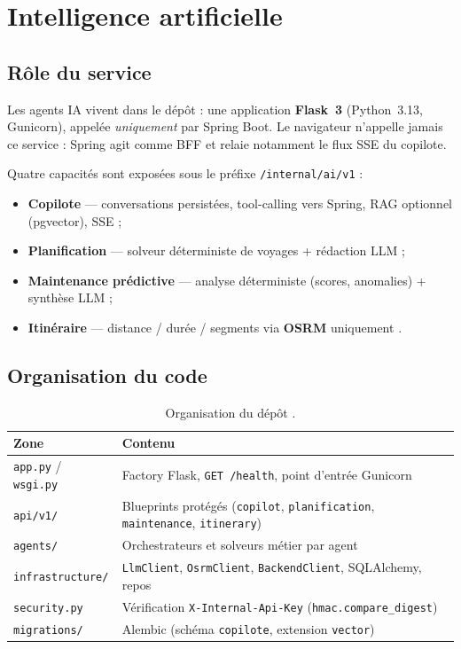 \chapter{Intelligence artificielle}
\label{chap:ia}

\section{Rôle du service}

Les agents IA vivent dans le dépôt  : une application \textbf{Flask~3}
(Python~3.13, Gunicorn), appelée \emph{uniquement} par Spring Boot. Le navigateur n'appelle jamais
ce service : Spring agit comme BFF et relaie notamment le flux SSE du copilote.

Quatre capacités sont exposées sous le préfixe \texttt{/internal/ai/v1} :

\begin{itemize}[leftmargin=*]
  \item \textbf{Copilote} --- conversations persistées, tool-calling vers Spring, RAG optionnel (pgvector), SSE ;
  \item \textbf{Planification} --- solveur déterministe de voyages + rédaction LLM ;
  \item \textbf{Maintenance prédictive} --- analyse déterministe (scores, anomalies) + synthèse LLM ;
  \item \textbf{Itinéraire} --- distance / durée / segments via \textbf{OSRM} uniquement \cite{osrm}.
\end{itemize}


\section{Organisation du code}

\begin{table}[ht]
\centering
\caption{Organisation du dépôt .}
\label{tab:ia-layout}
\small
\begin{tabular}{@{}lp{9.2cm}@{}}
\toprule
Zone & Contenu \\
\midrule
\texttt{app.py} / \texttt{wsgi.py} & Factory Flask, \texttt{GET /health}, point d'entrée Gunicorn \\
\texttt{api/v1/} & Blueprints protégés (\texttt{copilot}, \texttt{planification}, \texttt{maintenance}, \texttt{itinerary}) \\
\texttt{agents/} & Orchestrateurs et solveurs métier par agent \\
\texttt{infrastructure/} & \texttt{LlmClient}, \texttt{OsrmClient}, \texttt{BackendClient}, SQLAlchemy, repos \\
\texttt{security.py} & Vérification \texttt{X-Internal-Api-Key} (\texttt{hmac.compare\_digest}) \\
\texttt{migrations/} & Alembic (schéma \texttt{copilote}, extension \texttt{vector}) \\
\bottomrule
\end{tabular}
\end{table}

